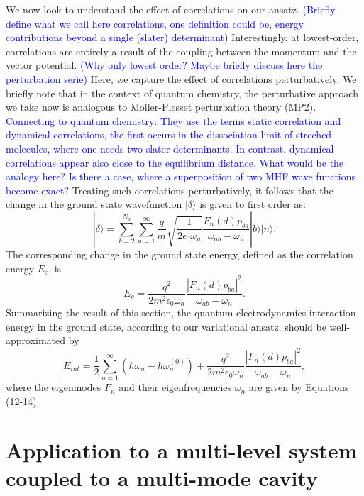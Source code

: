 \documentclass[aps,prb,twocolumn,
	groupedaddress,superscriptaddress,
	amsfonts,amssymb,amsmath,floatfix,
	citeautoscript]{revtex4-1}
\newcommand{\Jadd}[1]{\textcolor{blue}{#1}}
\begin{document}
We now look to understand the effect of correlations on our ansatz. \Jadd{(Briefly define what we call here correlations, one definition could be, energy contributions beyond a single (slater) determinant)} Interestingly, at lowest-order, correlations are entirely a result of the coupling between the momentum and the vector potential. \Jadd{(Why only lowest order? Maybe briefly discuss here the perturbation serie)} Here, we capture the effect of correlations perturbatively. We briefly note that in the context of quantum chemistry, the perturbative approach we take now is analogous to Moller-Plesset perturbation theory (MP2). \Jadd{Connecting to quantum chemistry: They use the terms static correlation and dynamical correlations, the first occurs in the dissociation limit of streched molecules, where one needs two slater determinants. In contrast, dynamical correlations appear also close to the equilibrium distance. What would be the analogy here? Is there a case, where a superposition of two MHF wave functions become exact?}
Treating such correlations perturbatively, it follows that the change in the ground state wavefunction $|\delta\rangle$ is given to first order as:
\begin{equation}\label{eq:MP2wavefunction}
|\delta\rangle = \sum\limits_{b = 2}^{N_a}\sum\limits_{n=1}^{\infty} \frac{q}{m}\sqrt{\frac{1}{2\epsilon_0\omega_n}}\frac{F_n(d)p_{ba}}{\omega_{ab}-\omega_n}|b\rangle|n\rangle.
\end{equation}
The corresponding change in the ground state energy, defined as the correlation energy $E_c$, is
\begin{equation}\label{eq:MP2energy}
E_{c} = \frac{q^2}{2m^2\epsilon_0\omega_n}\frac{|F_n(d)p_{ba}|^2}{\omega_{ab}-\omega_n}.
\end{equation}
Summarizing the result of this section, the quantum electrodynamics interaction energy in the ground state, according to our variational ansatz, should be well-approximated by
\begin{equation}\label{eq:total_interaction_energy}
E_{int} = \frac{1}{2}\sum\limits_{n=1}^{\infty}\left(\hbar\omega_n - \hbar\omega_n^{(0)} \right) + \frac{q^2}{2m^2\epsilon_0\omega_n}\frac{|F_n(d)p_{ba}|^2}{\omega_{ab}-\omega_n},
\end{equation}
where the eigenmodes $F_n$ and their eigenfrequencies $\omega_n$ are given by Equations (12-14).

\section{Application to a multi-level system coupled to a multi-mode cavity}
\label{sec:multi-level}
\end{document}
